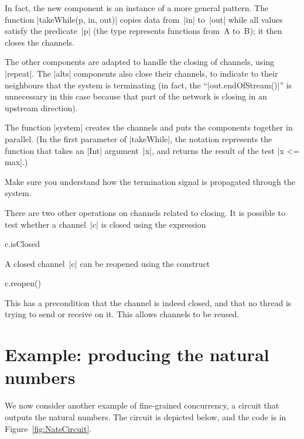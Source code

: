 
In fact, the new component is an instance of a more general pattern.  The
function |takeWhile(p, in, out)| copies data from~|in| to~|out| while all
values satisfy the predicate~|p| (the type \protect{}
  represents functions from~{\scalashape A} to~{\scalashape B}); it then
closes the channels.  

The other components are adapted to handle the closing of channels, using
|repeat|.  The |alts| components also close their channels, to indicate to
their neighbours that the system is terminating (in fact, the
``|out.endOfStream()|'' is unnecessary in this case because that part of the
network is closing in an upstream direction). 

The function |system| creates the channels and puts the components together in
parallel.  (In the first parameter of |takeWhile|, the notation  represents the function that takes an |Int| argument~|x|,
and returns the result of the test |x <= max|.)

\begin{instruction}
Make sure you understand how the termination signal is propagated through the
system. 
\end{instruction}

There are two other operations on channels related to closing. 
It is possible to test whether a channel~|c| is closed using the expression
%
\begin{scala}
  c.isClosed
\end{scala}
%
A closed channel~|c| can be reopened using the construct
\begin{scala}
  c.reopen()
\end{scala}
%
This has a precondition that the channel is indeed closed, and that no thread
is trying to send or receive on it.  This allows channels to be reused.



\section{Example: producing the natural numbers}

We now consider another example of fine-grained concurrency, a circuit that
outputs the natural numbers.  The circuit is depicted below, and the code is
in Figure~\ref{fig:NatsCircuit}. 

